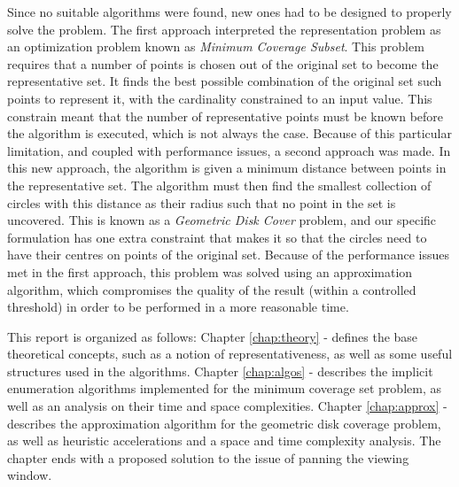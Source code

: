 \begin{changed}
Since no suitable algorithms were found, new ones had to be designed to properly solve the problem. The first approach interpreted the representation problem as an optimization problem known as \emph{Minimum Coverage Subset}. This problem requires that a number of points is chosen out of the original set to become the representative set. It finds the best possible combination of the original set such points to represent it, with the cardinality constrained to an input value. This constrain meant that the number of representative points must be known before the algorithm is executed, which is not always the case. Because of this particular limitation, and coupled with performance issues, a second approach was made. In this new approach, the algorithm is given a minimum distance between points in the representative set. The algorithm must then find the smallest collection of circles with this distance as their radius such that no point in the set is uncovered. This is known as a \emph{Geometric Disk Cover} problem, and our specific formulation has one extra constraint that makes it so that the circles need to have their centres on points of the original set. Because of the performance issues met in the first approach, this problem was solved using an approximation algorithm, which compromises the quality of the result (within a controlled threshold) in order to be performed in a more reasonable time. 

This report is organized as follows:
Chapter \ref{chap:theory} -  defines the base theoretical concepts, such as a notion of representativeness, as well as some useful structures used in the algorithms. Chapter \ref{chap:algos} -  describes the implicit enumeration algorithms implemented for the minimum coverage set problem, as well as an analysis on their time and space complexities. Chapter \ref{chap:approx} -  describes the approximation algorithm for the geometric disk coverage problem, as well as heuristic accelerations and a space and time complexity analysis. The chapter ends with a proposed solution to the issue of panning the viewing window.

\end{changed}